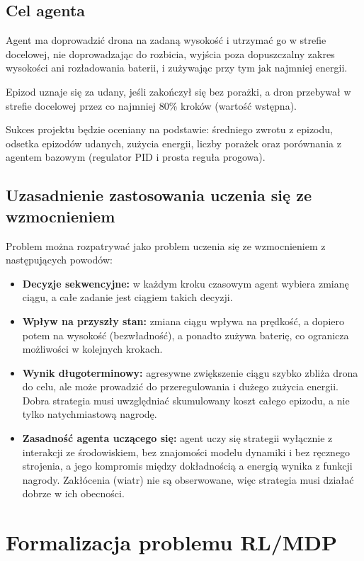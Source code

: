 \documentclass[12pt]{article}
\begin{document}
\subsection{Cel agenta}

Agent ma doprowadzić drona na zadaną wysokość i utrzymać go w strefie docelowej, nie doprowadzając do rozbicia, wyjścia poza dopuszczalny zakres wysokości ani rozładowania baterii, i zużywając przy tym jak najmniej energii.

Epizod uznaje się za udany, jeśli zakończył się bez porażki, a dron przebywał w strefie docelowej przez co najmniej 80\% kroków (wartość wstępna).

Sukces projektu będzie oceniany na podstawie: średniego zwrotu z epizodu, odsetka epizodów udanych, zużycia energii, liczby porażek oraz porównania z agentem bazowym (regulator PID i prosta reguła progowa).

\subsection{Uzasadnienie zastosowania uczenia się ze wzmocnieniem}

Problem można rozpatrywać jako problem uczenia się ze wzmocnieniem z następujących powodów:
\begin{itemize}
    \item \textbf{Decyzje sekwencyjne:} w każdym kroku czasowym agent wybiera zmianę ciągu, a całe zadanie jest ciągiem takich decyzji.
    \item \textbf{Wpływ na przyszły stan:} zmiana ciągu wpływa na prędkość, a dopiero potem na wysokość (bezwładność), a ponadto zużywa baterię, co ogranicza możliwości w kolejnych krokach.
    \item \textbf{Wynik długoterminowy:} agresywne zwiększenie ciągu szybko zbliża drona do celu, ale może prowadzić do przeregulowania i dużego zużycia energii. Dobra strategia musi uwzględniać skumulowany koszt całego epizodu, a nie tylko natychmiastową nagrodę.
    \item \textbf{Zasadność agenta uczącego się:} agent uczy się strategii wyłącznie z interakcji ze środowiskiem, bez znajomości modelu dynamiki i bez ręcznego strojenia, a jego kompromis między dokładnością a energią wynika z funkcji nagrody. Zakłócenia (wiatr) nie są obserwowane, więc strategia musi działać dobrze w ich obecności.
\end{itemize}

\section{Formalizacja problemu RL/MDP}
\end{document}
